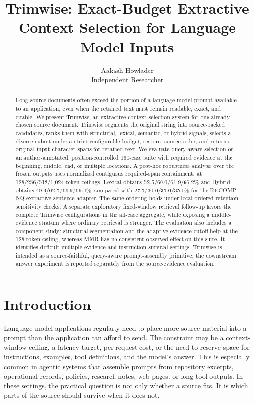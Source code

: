 \documentclass[
]{article}
\title{Trimwise: Exact-Budget Extractive Context Selection for Language
Model Inputs}
\author{Aakash Howlader\\\small Independent Researcher}
\date{}
\begin{document}
\maketitle

\begin{abstract}

Long source documents often exceed the portion of a language-model
prompt available to an application, even when the retained text must
remain readable, exact, and citable. We present Trimwise, an extractive
context-selection system for one already-chosen source document.
Trimwise segments the original string into source-backed candidates,
ranks them with structural, lexical, semantic, or hybrid signals,
selects a diverse subset under a strict configurable budget, restores
source order, and returns original-input character spans for retained
text. We evaluate query-aware selection on an author-annotated,
position-controlled 160-case suite with required evidence at the beginning,
middle, end, or multiple locations. A post-hoc robustness analysis over
the frozen outputs uses normalized contiguous required-span containment:
at 128/256/512/1,024-token ceilings, Lexical obtains
52.5/60.0/61.9/66.2\% and Hybrid obtains 49.4/62.5/66.9/69.4\%, compared
with 27.5/30.6/35.0/35.0\% for the RECOMP NQ extractive sentence adapter.
The same ordering holds under local ordered-retention sensitivity checks.
A separate exploratory fixed-window retrieval follow-up favors the complete
Trimwise configurations in the all-case aggregate, while exposing a
middle-evidence stratum where ordinary retrieval is stronger. The evaluation
also includes a component study: structural segmentation and the adaptive
evidence cutoff help at the 128-token ceiling, whereas MMR has no consistent
observed effect on this suite. It identifies difficult multiple-evidence and
instruction-survival settings. Trimwise is intended as a
source-faithful, query-aware prompt-assembly primitive; the downstream
answer experiment is reported separately from the source-evidence
evaluation.
\end{abstract}

\section{Introduction}\label{introduction}

Language-model applications regularly need to place more source material
into a prompt than the application can afford to send. The constraint
may be a context-window ceiling, a latency target, per-request cost, or
the need to reserve space for instructions, examples, tool definitions,
and the model's answer. This is especially common in agentic systems
that assemble prompts from repository excerpts, operational records,
policies, research notes, web pages, or long tool outputs. In these
settings, the practical question is not only whether a source fits. It
is which parts of the source should survive when it does not.
\end{document}
